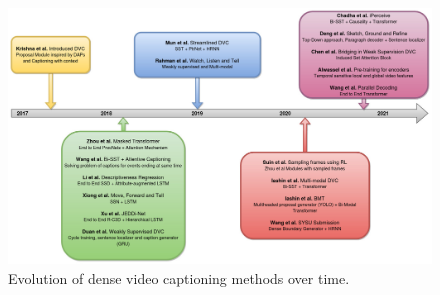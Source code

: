 \begin{figure}[h]
	\includegraphics[width=\linewidth]{assets/img/timeline.jpg}
	\caption{Evolution of dense video captioning methods over time.}
\end{figure}

